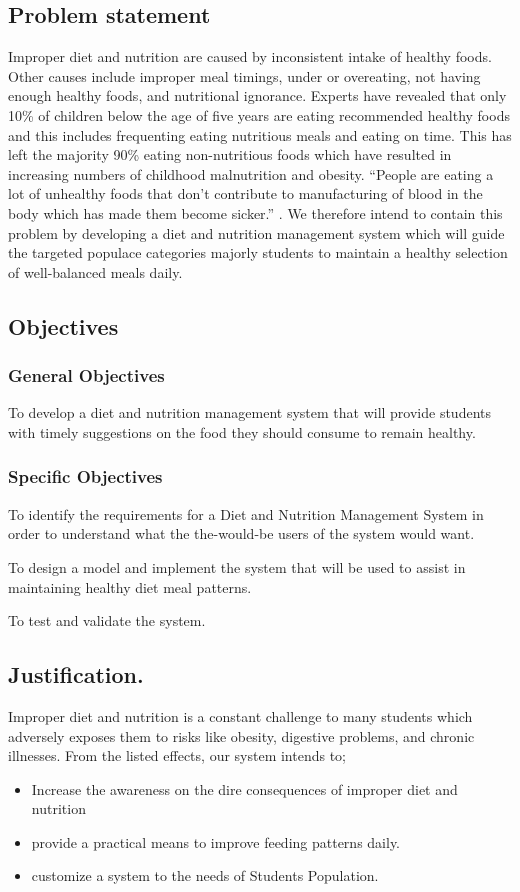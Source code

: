 \documentclass{article}
\begin{document}
\subsection{Problem statement}
Improper diet and nutrition are caused by inconsistent intake of healthy foods. Other causes include improper meal timings, under or overeating, not having enough healthy foods, and nutritional ignorance. Experts have revealed that only 10\% of children below the age of five years are eating recommended healthy foods and this includes frequenting eating nutritious meals and eating on time. This has left the majority 90\% eating non-nutritious foods which have resulted in increasing numbers of childhood malnutrition and obesity\cite{newvision}. “People are eating a lot of unhealthy foods that don’t contribute to manufacturing of blood in the body which has made them become sicker.” \cite{newvision}. We therefore intend to contain this problem by developing a diet and nutrition management system which will guide the targeted populace categories majorly students to maintain a healthy selection of well-balanced meals daily.

\subsection{Objectives}
\subsubsection{General Objectives}

To develop a diet and nutrition management system that will provide students with timely suggestions on the food they should consume to remain healthy. 

\subsubsection{Specific Objectives}

To identify the requirements for a Diet and Nutrition Management System in order to understand what the the-would-be users of the system would want.

To design a model and implement the system that will be used to assist in maintaining healthy diet meal patterns.

To test and validate the system.  

\subsection{Justification.}
Improper diet and nutrition is a constant challenge to many students which adversely exposes them to risks like obesity, digestive problems, and chronic illnesses. From the listed effects, our system intends to; 
\begin{itemize}
  \item Increase the awareness on the dire consequences of improper diet and nutrition
  \item provide a practical means to improve feeding patterns daily. 
  \item customize a system to the needs of Students Population. 

\end{itemize}
\end{document}
